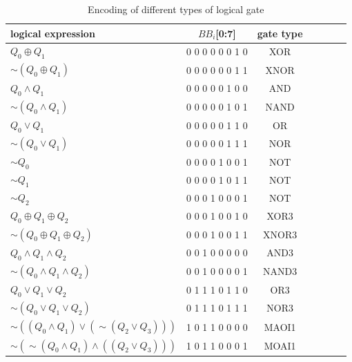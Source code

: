 \documentclass[final,5p,times,twocolumn]{elsarticle}
\begin{document}
\begin{table}[h]
    \caption{Encoding of different types of logical gate}\label{tab3}%
    \begin{tabular}{lcccccc}
        \toprule
        logical expression                                   & $BB_i$[0:7]     & gate type \\
        \midrule
        $Q_0 \oplus Q_1$                                     & 0 0 0 0 0 0 1 0 & XOR       \\
        $\sim (Q_0 \oplus Q_1)$                              & 0 0 0 0 0 0 1 1 & XNOR      \\
        $Q_0 \land Q_1$                                      & 0 0 0 0 0 1 0 0 & AND       \\
        $\sim (Q_0 \land Q_1)$                               & 0 0 0 0 0 1 0 1 & NAND      \\
        $Q_0 \lor Q_1$                                       & 0 0 0 0 0 1 1 0 & OR        \\
        $\sim (Q_0 \lor Q_1)$                                & 0 0 0 0 0 1 1 1 & NOR       \\
        $\sim Q_0$                                           & 0 0 0 0 1 0 0 1 & NOT       \\
        $\sim Q_1$                                           & 0 0 0 0 1 0 1 1 & NOT       \\
        $\sim Q_2$                                           & 0 0 0 1 0 0 0 1 & NOT       \\
        $Q_0 \oplus Q_1 \oplus Q_2$                          & 0 0 0 1 0 0 1 0 & XOR3      \\
        $\sim (Q_0 \oplus Q_1 \oplus Q_2)$                   & 0 0 0 1 0 0 1 1 & XNOR3     \\
        $Q_0 \land Q_1 \land Q_2$                            & 0 0 1 0 0 0 0 0 & AND3      \\
        $\sim (Q_0 \land Q_1 \land Q_2)$                     & 0 0 1 0 0 0 0 1 & NAND3     \\
        $Q_0 \lor Q_1 \lor Q_2$                              & 0 1 1 1 0 1 1 0 & OR3       \\
        $\sim (Q_0 \lor Q_1 \lor Q_2)$                       & 0 1 1 1 0 1 1 1 & NOR3      \\
        $\sim ((Q_0 \land Q_1) \lor (\sim (Q_2 \lor Q_3)))$  & 1 0 1 1 0 0 0 0 & MAOI1     \\
        $\sim (\sim (Q_0 \land Q_1) \land ((Q_2 \lor Q_3)))$ & 1 0 1 1 0 0 0 1 & MOAI1     \\
        \bottomrule
    \end{tabular}
\end{table}
\end{document}
